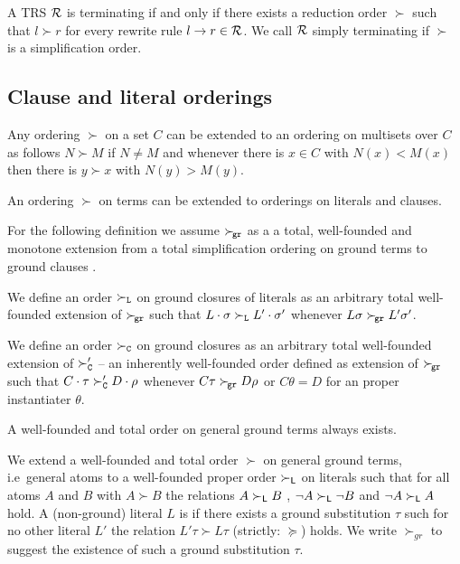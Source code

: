 \begin{theorem}
	A TRS \( \mathcal{R} \) is terminating if and only if there exists a reduction order \( \succ \)
	such that \( l\succ r \) for every rewrite rule \( l\rightarrow r\in\mathcal{R} \).
	We call \( \mathcal{R} \) simply terminating if \( \succ \) is a simplification order.
\end{theorem}

\subsection{Clause and literal orderings}

\begin{lemma}
	Any ordering \( \succ \) on a set \( C \) can be extended to an ordering on multisets over \( C \)
	as follows \( N \succ M \) if \( N \neq M \)
	and whenever there is \( x\in C \) with \( N(x) < M(x) \)
	then there is \( y \succ x \) with \( N(y) > M(y) \).

	An ordering \( \succ \) on terms can be extended to orderings on literals and clauses.
\end{lemma}
For the following definition we assume
\( \mathrel\succ_{\!\mathtt{gr}} \) as a a total, well-founded and monotone extension
from a total simplification ordering on ground terms
to ground clauses \cite{NR2001}.

\begin{definition}
    We define an order \( \mathrel\succ_{\mathtt{L}} \) on ground closures of literals
    as an arbitrary total well-founded extension of \( \mathrel\succ_{\!\mathtt{gr}} \)
    such that
    \( L\cdot\sigma\mathrel\succ_{\mathtt{L}} L'\cdot\sigma' \) whenever
    \( L\sigma\mathrel\succ_{\!\mathtt{gr}} L'\sigma' \).

    We define an order \( \mathrel\succ_{\mathtt{C}} \) on ground closures
    as an arbitrary total well-founded extension of
    \( \mathrel\succ_{\mathtt{C}}' \) -- an inherently well-founded order defined as extension of \( \mathrel\succ_{\!\mathtt{gr}} \)
    such that
    \( C\cdot\tau\mathrel\succ_{\mathtt{C}}' D\cdot\rho \) whenever
    \( C\tau\mathrel\succ_{\!\mathtt{gr}} D\rho \) or \( C\theta = D \) for an proper instantiater \( \theta \).
\end{definition}

\begin{lemma}A well-founded and total order on general ground terms always exists.\end{lemma}

	\begin{definition}\label{def:orders-on-literals}
		We extend a well-founded and total order \( \succ \) on general ground terms,
		i.e~general atoms to a well-founded proper order \( \succ_{\mathsf{L}} \)
		on literals such that for all atoms \( A \) and \( B \) with \( A\succ B \)
		the relations \( A\succ_{\mathsf{L}} B \) ,
		\( \lnot A\succ_{\mathsf{L}}\lnot B \) and
		\( \lnot A\succ_{\mathsf{L}} A \) hold.
		A (non-ground) literal \( L \) is  if there exists a ground substitution \( \tau \)
		such for no other literal \( L' \) the relation \( L'\tau\succ L\tau \) (strictly: \( \succcurlyeq \)) holds.
		We write \( \succ_{gr} \) to suggest the existence of such a ground substitution \( \tau \).
	\end{definition}



